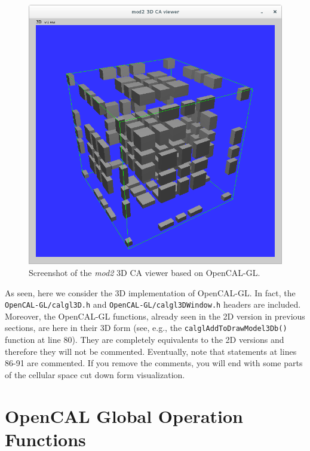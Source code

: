 

\begin{figure}
  \begin{center}
    \includegraphics[width=12cm]{./images/OpenCAL/calgl_mod2}
    \caption{Screenshot of the \emph{mod2} 3D CA viewer based on
      OpenCAL-GL.}
    \label{fig:calgl_mod2}
  \end{center}
\end{figure}

As seen, here we consider the 3D implementation of
OpenCAL-GL. In fact, the \verb'OpenCAL-GL/calgl3D.h' and
\verb'OpenCAL-GL/calgl3DWindow.h' headers are included. Moreover, the
OpenCAL-GL functions, already seen in the 2D version in previous
sections, are here in their 3D form (see, e.g., the
\verb'calglAddToDrawModel3Db()' function at line 80). They are
completely equivalents to the 2D versions and therefore they will not
be commented. Eventually, note that statements at lines 86-91 are
commented. If you remove the comments, you will end with some parts of
the cellular space cut down form visualization.


\section{OpenCAL Global Operation Functions}\label{sec:redution}

